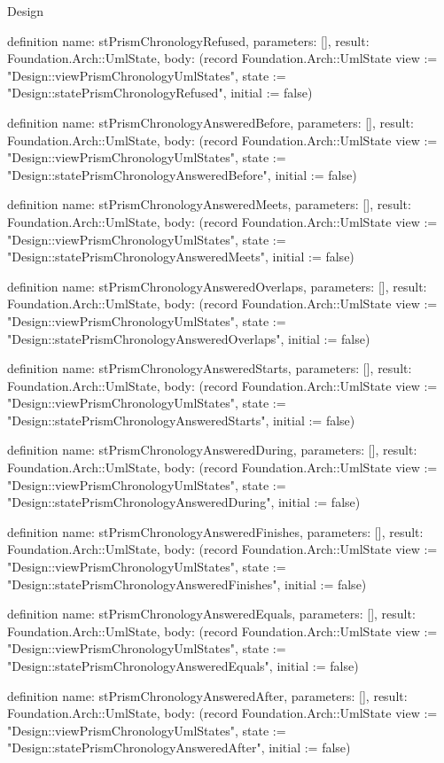\begin{lexlean}{Design}
\begin{semanticmodule}
definition{
  name: stPrismChronologyRefused,
  parameters: [],
  result: Foundation.Arch::UmlState,
  body: (record Foundation.Arch::UmlState {view := "Design::viewPrismChronologyUmlStates", state := "Design::statePrismChronologyRefused", initial := false})
}

definition{
  name: stPrismChronologyAnsweredBefore,
  parameters: [],
  result: Foundation.Arch::UmlState,
  body: (record Foundation.Arch::UmlState {view := "Design::viewPrismChronologyUmlStates", state := "Design::statePrismChronologyAnsweredBefore", initial := false})
}

definition{
  name: stPrismChronologyAnsweredMeets,
  parameters: [],
  result: Foundation.Arch::UmlState,
  body: (record Foundation.Arch::UmlState {view := "Design::viewPrismChronologyUmlStates", state := "Design::statePrismChronologyAnsweredMeets", initial := false})
}

definition{
  name: stPrismChronologyAnsweredOverlaps,
  parameters: [],
  result: Foundation.Arch::UmlState,
  body: (record Foundation.Arch::UmlState {view := "Design::viewPrismChronologyUmlStates", state := "Design::statePrismChronologyAnsweredOverlaps", initial := false})
}

definition{
  name: stPrismChronologyAnsweredStarts,
  parameters: [],
  result: Foundation.Arch::UmlState,
  body: (record Foundation.Arch::UmlState {view := "Design::viewPrismChronologyUmlStates", state := "Design::statePrismChronologyAnsweredStarts", initial := false})
}

definition{
  name: stPrismChronologyAnsweredDuring,
  parameters: [],
  result: Foundation.Arch::UmlState,
  body: (record Foundation.Arch::UmlState {view := "Design::viewPrismChronologyUmlStates", state := "Design::statePrismChronologyAnsweredDuring", initial := false})
}

definition{
  name: stPrismChronologyAnsweredFinishes,
  parameters: [],
  result: Foundation.Arch::UmlState,
  body: (record Foundation.Arch::UmlState {view := "Design::viewPrismChronologyUmlStates", state := "Design::statePrismChronologyAnsweredFinishes", initial := false})
}

definition{
  name: stPrismChronologyAnsweredEquals,
  parameters: [],
  result: Foundation.Arch::UmlState,
  body: (record Foundation.Arch::UmlState {view := "Design::viewPrismChronologyUmlStates", state := "Design::statePrismChronologyAnsweredEquals", initial := false})
}

definition{
  name: stPrismChronologyAnsweredAfter,
  parameters: [],
  result: Foundation.Arch::UmlState,
  body: (record Foundation.Arch::UmlState {view := "Design::viewPrismChronologyUmlStates", state := "Design::statePrismChronologyAnsweredAfter", initial := false})
}


\end{semanticmodule}
\end{lexlean}
